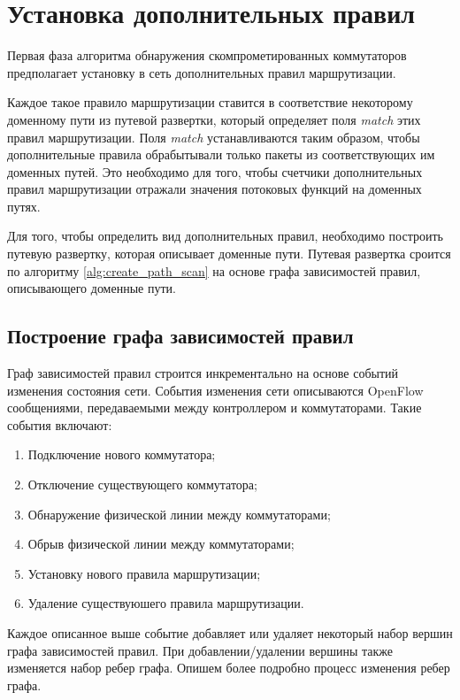 \documentclass[../thesis.tex]{subfiles}
\begin{document}
\pagebreak

\section{Установка дополнительных правил}

Первая фаза алгоритма обнаружения скомпрометированных коммутаторов предполагает установку в сеть дополнительных правил маршрутизации.

Каждое такое правило маршрутизации ставится в соответствие некоторому доменному пути из путевой развертки, который определяет поля \textit{match} этих правил маршрутизации.
Поля \textit{match} устанавливаются таким образом, чтобы дополнительные правила обрабытывали только пакеты из соответствующих им доменных путей.
Это необходимо для того, чтобы счетчики дополнительных правил маршрутизации отражали значения потоковых функций на доменных путях.

Для того, чтобы определить вид дополнительных правил, необходимо построить путевую развертку, которая описывает доменные пути.
Путевая развертка сроится по алгоритму \ref{alg:create_path_scan} на основе графа зависимостей правил, описывающего доменные пути.

\subsection{Построение графа зависимостей правил}

Граф зависимостей правил строится инкрементально на основе событий изменения состояния сети. События изменения сети описываются OpenFlow сообщениями, передаваемыми между контроллером и коммутаторами. Такие события включают:
\begin{enumerate}
\item Подключение нового коммутатора;
\item Отключение существующего коммутатора;
\item Обнаружение физической линии между коммутаторами;
\item Обрыв физической линии между коммутаторами;
\item Установку нового правила маршрутизации;
\item Удаление существуюшего правила маршрутизации.
\end{enumerate}

Каждое описанное выше событие добавляет или удаляет некоторый набор вершин графа зависимостей правил.
При добавлении/удалении вершины также изменяется набор ребер графа.
Опишем более подробно процесс изменения ребер графа.
\end{document}
